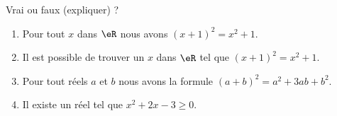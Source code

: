 
\begin{exercice}\label{exosmath-0560}

Vrai ou faux (expliquer) ?
\begin{enumerate}
    \item
        Pour tout \( x\) dans \( \eR\) nous avons \( (x+1)^2=x^2+1\).
    \item
        Il est possible de trouver un \( x\) dans \( \eR\) tel que \( (x+1)^2=x^2+1\).
    \item
        Pour tout réels \( a\) et \( b\) nous avons la formule \( (a+b)^2=a^2+3ab+b^2\).
    \item
        Il existe un réel tel que \( x^2+2x-3\geq 0\).
\end{enumerate}

\end{exercice}
